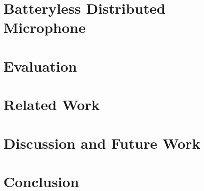 \documentclass[sigconf]{acmart}
\begin{document}
\section{Batteryless Distributed Microphone}
\label{sec:disMic}


\section{Evaluation}
\label{sec:evaluation}


\section{Related Work}
\label{sec:relatedWork}


\section{Discussion and Future Work}
\label{sec:discussion}

\section{Conclusion}

\newpage



\end{document}
